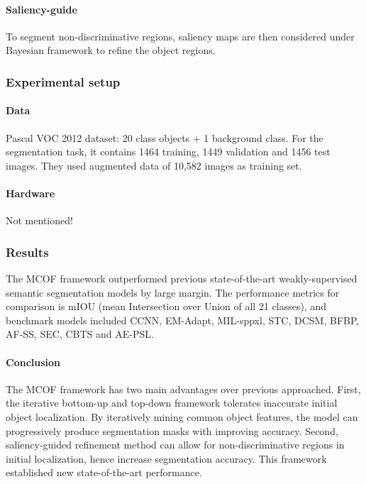\documentclass{article}
\begin{document}
\paragraph{Saliency-guide}
To segment non-discriminative regions, saliency maps are then considered under Bayesian framework to refine the object regions. 

\subsubsection{Experimental setup}

\paragraph{Data}
Pascal VOC 2012 dataset: 20 class objects + 1 background class. For the segmentation task, it contains 1464 training, 1449 validation and 1456 test images. They used augmented data of 10,582 images as training set.

\paragraph{Hardware}
Not mentioned!

\subsubsection{Results}
The MCOF framework outperformed previous state-of-the-art weakly-supervised semantic segmentation models by large margin. The performance metrics for comparison is mIOU (mean Intersection over Union of all 21 classes), and benchmark models included CCNN, EM-Adapt, MIL-sppxl, STC, DCSM, BFBP, AF-SS, SEC, CBTS and AE-PSL.

\paragraph{Conclusion}
The MCOF framework has two main advantages over previous approached. First, the iterative bottom-up and top-down framework tolerates inaccurate initial object localization. By iteratively mining common object features, the model can progressively produce segmentation masks with improving accuracy. Second, saliency-guided refinement method can allow for non-discriminative regions in initial localization, hence increase segmentation accuracy. This framework established new state-of-the-art performance.

\newpage



\end{document}

